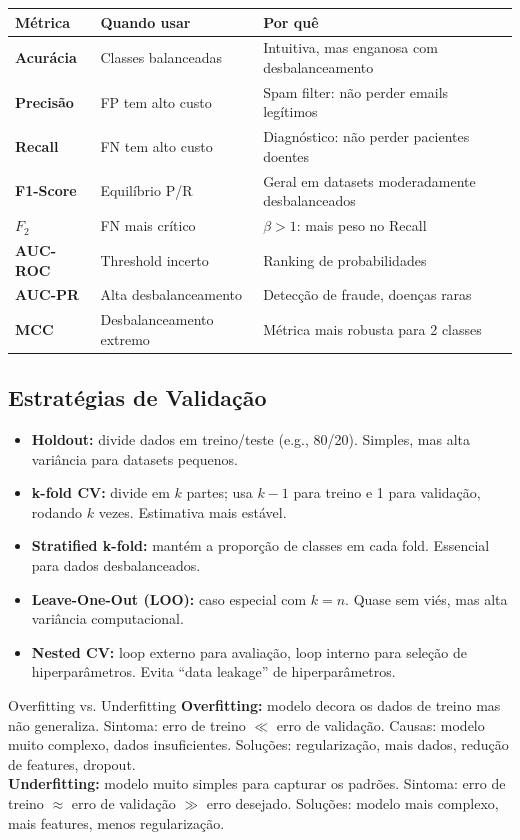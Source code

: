 \documentclass[12pt,a4paper]{article}
\begin{document}
\vspace{0.5em}
\begin{center}
\begin{tabular}{>{\bfseries}p{3cm}p{4cm}p{5cm}}
\toprule
Métrica & Quando usar & Por quê \\
\midrule
Acurácia & Classes balanceadas & Intuitiva, mas enganosa com desbalanceamento \\
Precisão & FP tem alto custo & Spam filter: não perder emails legítimos \\
Recall & FN tem alto custo & Diagnóstico: não perder pacientes doentes \\
F1-Score & Equilíbrio P/R & Geral em datasets moderadamente desbalanceados \\
$F_2$ & FN mais crítico & $\beta > 1$: mais peso no Recall \\
AUC-ROC & Threshold incerto & Ranking de probabilidades \\
AUC-PR & Alta desbalanceamento & Detecção de fraude, doenças raras \\
MCC & Desbalanceamento extremo & Métrica mais robusta para 2 classes \\
\bottomrule
\end{tabular}
\end{center}

\subsection{Estratégias de Validação}

\begin{itemize}
  \item \textbf{Holdout:} divide dados em treino/teste (e.g., 80/20). Simples, mas alta variância para datasets pequenos.
  \item \textbf{k-fold CV:} divide em $k$ partes; usa $k-1$ para treino e 1 para validação, rodando $k$ vezes. Estimativa mais estável.
  \item \textbf{Stratified k-fold:} mantém a proporção de classes em cada fold. Essencial para dados desbalanceados.
  \item \textbf{Leave-One-Out (LOO):} caso especial com $k=n$. Quase sem viés, mas alta variância computacional.
  \item \textbf{Nested CV:} loop externo para avaliação, loop interno para seleção de hiperparâmetros. Evita ``data leakage'' de hiperparâmetros.
\end{itemize}

\begin{atencaobox}{Overfitting vs. Underfitting}
\textbf{Overfitting:} modelo decora os dados de treino mas não generaliza. Sintoma: erro de treino $\ll$ erro de validação. Causas: modelo muito complexo, dados insuficientes. Soluções: regularização, mais dados, redução de features, dropout.\\
\textbf{Underfitting:} modelo muito simples para capturar os padrões. Sintoma: erro de treino $\approx$ erro de validação $\gg$ erro desejado. Soluções: modelo mais complexo, mais features, menos regularização.
\end{atencaobox}
\end{document}
